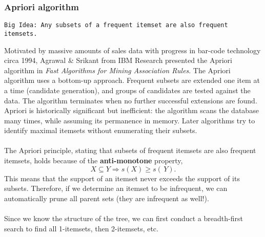 \documentclass[9pt,twocolumn]{article}
\begin{document}
\subsubsection*{Apriori algorithm}
\begin{lstlisting}
Big Idea: Any subsets of a frequent itemset are also frequent itemsets.
\end{lstlisting}
Motivated by massive amounts of sales data with progress in bar-code technology circa 1994, Agrawal \& Srikant from IBM Research presented the Apriori algorithm in \textit{Fast Algorithms for Mining Association Rules}. The Apriori algorithm uses a bottom-up approach. Frequent subsets are extended one item at a time (candidate generation), and groups of candidates are tested against the data. The algorithm terminates when no further successful extensions are found. Apriori is historically significant but inefficient: the algorithm scans the database many times, while assuming its permanence in memory. Later algorithms try to identify maximal itemsets without enumerating their subsets.\\
\\
The Apriori principle, stating that subsets of frequent itemsets are also frequent itemsets, holds because of the \textbf{anti-monotone} property, 
\begin{equation}
	X \subseteq Y \Rightarrow s(X) \geq s(\,Y).
\end{equation}
This means that the support of an itemset never exceeds the support of its subsets. Therefore, if we determine an itemset to be infrequent, we can automatically prune all parent sets (they are infrequent as well!).\\
\\
Since we know the structure of the tree, we can first conduct a breadth-first search to find all 1-itemsets, then 2-itemsets, etc. 	
\end{document}
